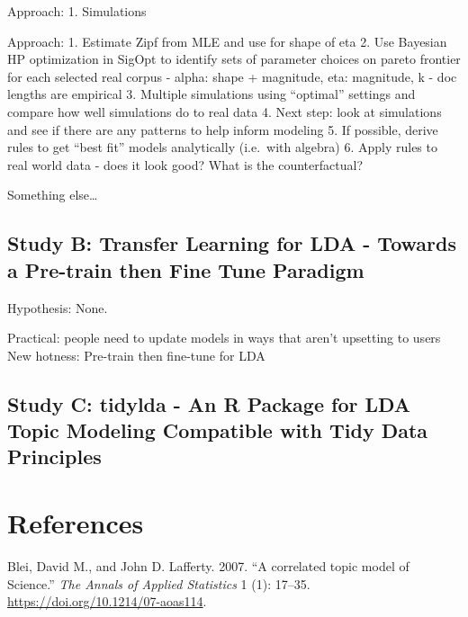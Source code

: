 \documentclass[conference,final,]{IEEEtran}
\begin{document}
Approach: 1. Simulations

Approach: 1. Estimate Zipf from MLE and use for shape of eta 2. Use
Bayesian HP optimization in SigOpt to identify sets of parameter choices
on pareto frontier for each selected real corpus - alpha: shape +
magnitude, eta: magnitude, k - doc lengths are empirical 3. Multiple
simulations using ``optimal'' settings and compare how well simulations
do to real data 4. Next step: look at simulations and see if there are
any patterns to help inform modeling 5. If possible, derive rules to get
``best fit'' models analytically (i.e.~with algebra) 6. Apply rules to
real world data - does it look good? What is the counterfactual?

Something else\ldots{}

\hypertarget{study-b-transfer-learning-for-lda---towards-a-pre-train-then-fine-tune-paradigm}{%
\subsection{Study B: Transfer Learning for LDA - Towards a Pre-train
then Fine Tune
Paradigm}\label{study-b-transfer-learning-for-lda---towards-a-pre-train-then-fine-tune-paradigm}}

Hypothesis: None.

Practical: people need to update models in ways that aren't upsetting to
users New hotness: Pre-train then fine-tune for LDA

\hypertarget{study-c-tidylda---an-r-package-for-lda-topic-modeling-compatible-with-tidy-data-principles}{%
\subsection{Study C: tidylda - An R Package for LDA Topic Modeling
Compatible with Tidy Data
Principles}\label{study-c-tidylda---an-r-package-for-lda-topic-modeling-compatible-with-tidy-data-principles}}

\newpage

\hypertarget{references}{%
\section*{References}\label{references}}

\hypertarget{refs}{}
\leavevmode\hypertarget{ref-blei2007ctm}{}%
Blei, David M., and John D. Lafferty. 2007. ``A correlated topic model
of Science.'' \emph{The Annals of Applied Statistics} 1 (1): 17--35.
\url{https://doi.org/10.1214/07-aoas114}.
\end{document}
